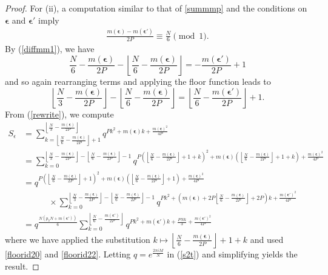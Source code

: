 \documentclass[11pt,reqno]{amsart}
\theoremstyle{definition}
\numberwithin{equation}{section}
\newcommand{\bea}{\begin{equation}\begin{aligned}}
\newcommand{\eea}{\end{aligned}\end{equation}}
\renewcommand{\=}{\;=\;}
\def\qqquad{\qquad\quad}
\begin{document}
\begin{proof}
For (ii), a computation similar to that of \eqref{summmp} and the conditions on $\bm \epsilon$ and $\bm \epsilon'$ imply
\bea\label{diffmm1}
\frac{m(\bm \epsilon)-m(\bm \epsilon')}{2P} \equiv \frac {N} 6 \pmod 1.
\eea
By (\ref{diffmm1}), we have
\begin{equation}\label{floorid20}
\frac N 6 - \frac{m(\bm \epsilon)}{2P}
-\left\lfloor\frac N 6 - \frac{m(\bm \epsilon)}{2P} \right\rfloor 
=-\frac{m(\bm \epsilon')}{2P}+1
\end{equation}
and so again rearranging terms and applying the floor function leads to
\begin{equation}\label{floorid22}
\left\lfloor\frac N 3 - \frac{m(\bm \epsilon)}{2P}\right\rfloor
-\left\lfloor\frac N 6 - \frac{m(\bm \epsilon)}{2P}\right\rfloor 
=\left\lfloor\frac N 6-\frac{m(\bm \epsilon')}{2P}\right\rfloor+1.
\end{equation}
From (\ref{rewrite}), we compute
\begin{equation} \label{s2t}
\begin{aligned}
S_{\epsilon}  &= \sum_{k=\left \lfloor \frac N6-\frac {m(\bm \epsilon)}{2P} \right \rfloor+1}
^{\left \lfloor \frac N3-\frac {m(\bm \epsilon)}{2P} \right \rfloor}
q^{P k^2+m(\bm \epsilon)k +\frac{m(\bm \epsilon)^2}{4P}}\\
&=\sum_{k=0}^{\left \lfloor \frac N 3 - \frac{m(\bm \epsilon)}{2P}\right\rfloor -\left\lfloor\frac N 6 - \frac{m(\bm \epsilon)}{2P}\right\rfloor-1}
q^{P \left ( \left \lfloor \frac{N}6-\frac{m(\bm \epsilon)}{2P} \right\rfloor+1+k \right)^2 + m(\bm \epsilon) \left ( \left\lfloor \frac N6-\frac{m(\bm \epsilon)}{2P} \right \rfloor+1+k \right) +\frac{m(\bm \epsilon)^2}{4P}}\\
&=q^{P \left (\left \lfloor \frac{N}6-\frac{m(\bm \epsilon)}{2P} \right \rfloor+1 \right)^2
+m(\bm \epsilon)\left ( \left \lfloor \frac N6-\frac{m(\bm \epsilon)}{2P} \right \rfloor+1 \right)
+\frac{m(\bm \epsilon)^2}{4P}}
\\
&\qqquad\times\sum_{k=0}^{\left\lfloor\frac N 3 - \frac{m(\bm \epsilon)}{2P}\right\rfloor
-\left\lfloor\frac N 6 - \frac{m(\bm \epsilon)}{2P}\right\rfloor-1}
q^{P k^2+ \left ( m(\bm \epsilon) + 2P \left \lfloor \frac N6-\frac{m(\bm \epsilon)}{2P} \right \rfloor+ 2P \right) k
+\frac{m(\bm \epsilon')^2}{4P}} \\ 
&= q^{\frac{N \left (p_3N+m(\bm \epsilon') \right)}{6}}
\sum_{k=0}^{\left \lfloor \frac N 6  - \frac{m(\bm \epsilon')}{2P} \right \rfloor}
q^{P k^2+m(\bm \epsilon')k + \frac{PNk}{3} + \frac{m(\bm \epsilon')^2}{4P}}
\end{aligned}
\end{equation}
where we have applied the substitution $k \mapsto \left \lfloor \frac{N}6-\frac{m(\bm \epsilon)}{2P} \right \rfloor+1+k$ and used
\eqref{floorid20} and \eqref{floorid22}. Letting $q=e^{\frac{2\pi iM}{N}}$ in (\ref{s2t}) and simplifying yields the result.


\end{proof}
\end{document}
